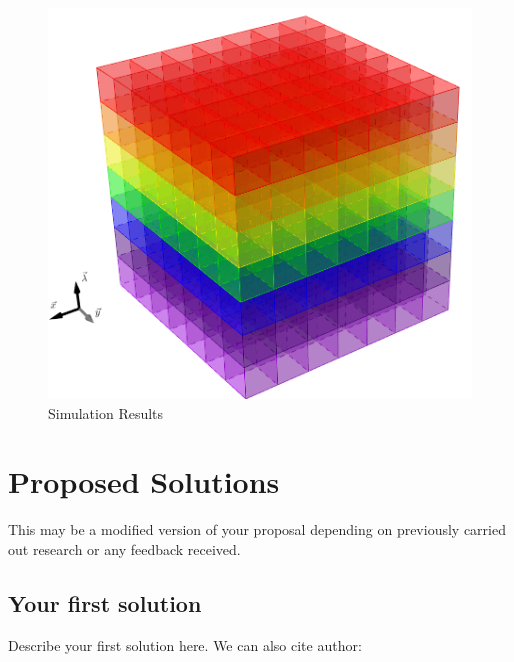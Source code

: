 \documentclass[peerreview]{IEEEtran}
\begin{document}
%
%
\begin{figure}[!h]
\centering
\includegraphics[width=0.8\columnwidth]{../../figures/fullcube.png} 
\caption{Simulation Results}
\label{fig_sim}
\end{figure}


\section{Proposed Solutions}
This may be a modified version of your proposal depending on previously carried out research or any feedback received.  
\subsection{Your first solution}
Describe your first solution here. We can also cite author: \cite{chanussotprasad2020}
\end{document}
